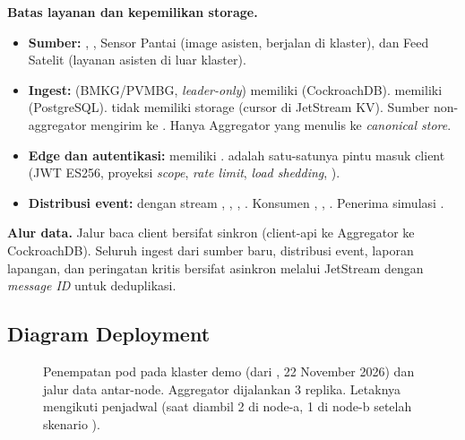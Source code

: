 \textbf{Batas layanan dan kepemilikan storage.}
\begin{itemize}
\item \textbf{Sumber:} , , Sensor Pantai (image asisten, berjalan di klaster), dan Feed Satelit (layanan asisten di luar klaster).
\item \textbf{Ingest:}  (BMKG/PVMBG, \textit{leader-only}) memiliki  (CockroachDB).  memiliki  (PostgreSQL).  tidak memiliki storage (cursor di JetStream KV). Sumber non-aggregator mengirim  ke . Hanya Aggregator yang menulis ke \textit{canonical store}.
\item \textbf{Edge dan autentikasi:}  memiliki .  adalah satu-satunya pintu masuk client (JWT ES256, proyeksi \textit{scope}, \textit{rate limit}, \textit{load shedding}, ).
\item \textbf{Distribusi event:}  dengan stream , , , . Konsumen , , . Penerima simulasi .
\end{itemize}

\textbf{Alur data.} Jalur baca client bersifat sinkron (client-api ke Aggregator ke CockroachDB). Seluruh ingest dari sumber baru, distribusi event, laporan lapangan, dan peringatan kritis bersifat asinkron melalui JetStream dengan \textit{message ID} untuk deduplikasi.

\subsection{Diagram Deployment}

\begin{figure}[H]
\centering
\resizebox{\textwidth}{!}{}
\caption{Penempatan pod pada klaster demo (dari , 22 November 2026) dan jalur data antar-node. Aggregator dijalankan 3 replika. Letaknya mengikuti penjadwal (saat diambil 2 di node-a, 1 di node-b setelah skenario ).}
\end{figure}

